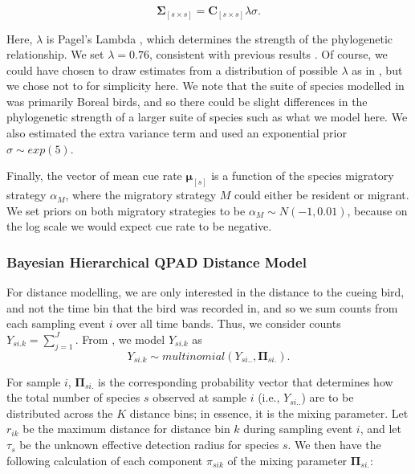 \documentclass[12pt]{article}
\begin{document}
$$\mathbf{\Sigma}_{[s \times s]} = \mathbf{C}_{[s \times s]}\lambda\sigma.$$

\par Here, $\lambda$ is Pagel's Lambda \citep{pagel_inferring_1999}, which determines the strength of the phylogenetic relationship. 
We set $\lambda = 0.76$, consistent with previous results \cite{solymos_phylogeny_2018}. 
Of course, we could have chosen to draw estimates from a distribution of possible $\lambda$ as in \citet{solymos_phylogeny_2018}, but we chose not to for simplicity here. 
We note that the suite of species modelled in \citet{solymos_evaluating_2018} was primarily Boreal birds, and so there could be slight differences in the phylogenetic strength of a larger suite of species such as what we model here.
We also estimated the extra variance term and used an exponential prior $\sigma \sim exp(5)$.

\par Finally, the vector of mean cue rate $\mathbf{\mu}_{[s]}$ is a function of the species migratory strategy $\alpha_M$, where the migratory strategy $M$ could either be resident or migrant. 
We set priors on both migratory strategies to be $\alpha_M \sim N(-1, 0.01)$, because on the log scale we would expect cue rate to be negative. 

\subsubsection{Bayesian Hierarchical QPAD Distance Model}

\par For distance modelling, we are only interested in the distance to the cueing bird, and not the time bin that the bird was recorded in, and so we sum counts from each sampling event $i$ over all time bands. 
Thus, we consider counts $Y_{si.k} = \sum_{j=1}^{J}$. 
From \citet{solymos_calibrating_2013}, we model $Y_{si.k}$ as
$$Y_{si.k} \sim multinomial\left(Y_{si..}, \mathbf{\Pi}_{si.}\right).$$

\par For sample $i$, $\mathbf{\Pi}_{si.}$ is the corresponding probability vector that determines how the total number of species $s$ observed at sample $i$ (i.e., $Y_{si..}$) are to be distributed across the $K$ distance bins; in essence, it is the mixing parameter. 
Let $r_{ik}$ be the maximum distance for distance bin $k$ during sampling event $i$, and let $\tau_s$ be the unknown effective detection radius for species $s$. 
We then have the following calculation of each component $\pi_{sik}$ of the mixing parameter $\mathbf{\Pi}_{si.}$:
\end{document}
